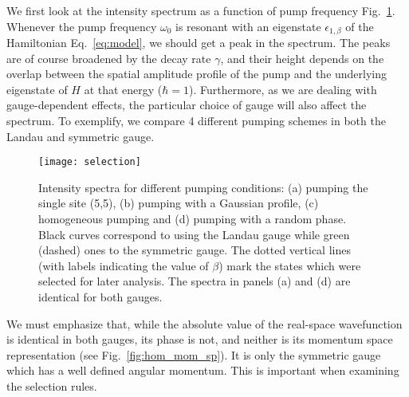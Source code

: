 \documentclass[twocolumn, 10pt, aps, superscriptaddress, floatfix, showpacs, pra, citeautoscript]{revtex4-1}
\newcommand{\co}[2]{#2}
\renewcommand{\paragraph}{\co}
\begin{document}
\paragraph{The overlap between the pump state and the eigenstate determines the intensity.}
We first look at the intensity spectrum as a function of pump
frequency Fig.~\ref{fig:pumping_schemes}.  Whenever the pump frequency
$\omega_0$ is resonant with an eigenstate $\epsilon_{1,\beta}$ of the
Hamiltonian Eq.~\eqref{eq:model}, we should get a peak in the
spectrum. The peaks are of course broadened by the decay rate
$\gamma$, and their height depends on the overlap between the spatial
amplitude profile of the pump and the underlying eigenstate of $H$ at
that energy ($\hbar = 1$). Furthermore, as we are dealing with
gauge-dependent effects, the particular choice of gauge will also
affect the spectrum. To exemplify, we compare 4 different pumping
schemes in both the Landau and symmetric gauge.
%

\begin{figure}[htb]\centering
  \texttt{[image: selection]} %
  \caption{Intensity spectra for different pumping conditions: (a)
    pumping the single site (5,5), (b) pumping with a Gaussian
    profile, (c) homogeneous pumping and (d) pumping with a random
    phase. Black curves correspond to using the Landau gauge while
    green (dashed) ones to the symmetric gauge. The dotted vertical
    lines (with labels indicating the value of $\beta$) mark the
    states which were selected for later analysis. The spectra in
    panels (a) and (d) are identical for both gauges.}
  \label{fig:pumping_schemes}
\end{figure}

We must emphasize that, while the absolute value of the real-space
wavefunction is identical in both gauges, its phase is not, and
neither is its momentum space representation (see
Fig.~\ref{fig:hom_mom_sp}). It is only the symmetric gauge which has a
well defined angular momentum. This is important when examining the
selection rules.

\paragraph{A δ pump in real space is homogeneous in momentum space.}

\end{document}
